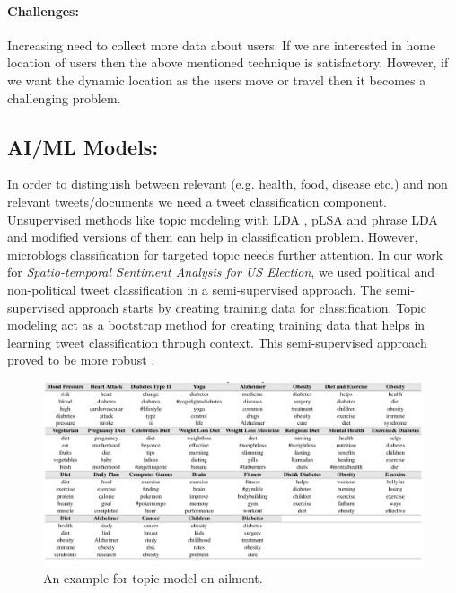 \vspace{-2mm}
\paragraph{Challenges:}
Increasing need to collect more data about users. If we are interested in home location of users then the above mentioned \cite{compton2014geotagging} technique is satisfactory. However, if we want the dynamic location as the users move or travel then it becomes a challenging problem.


\subsection{AI/ML Models:}
In order to distinguish between relevant (e.g. health, food, disease etc.) and  non relevant tweets/documents we need a tweet classification component. Unsupervised methods like topic modeling with LDA \cite{blei2003latent}, pLSA \cite{hofmann1999probabilistic} and phrase LDA \cite{el2014scalable} and modified versions of them can help in classification problem. However, microblogs classification for targeted topic needs further attention. In our work \cite{paul2017compass} for {\em Spatio-temporal Sentiment Analysis for US Election}, we used political and non-political tweet classification in a semi-supervised approach. The semi-supervised approach starts by creating training data for classification. Topic modeling act as a bootstrap method for creating training data that helps in learning tweet classification through context. This semi-supervised approach proved to be more robust \cite{paul2017compass}.

\begin{figure}[t]
	\includegraphics[width=0.99\linewidth ]{fig/HealthTopicExample.png}
    \vspace{-2mm}
    \caption{An example for topic model on ailment\cite{paul2012model}.}
    \label{fig:topic}
\end{figure}


